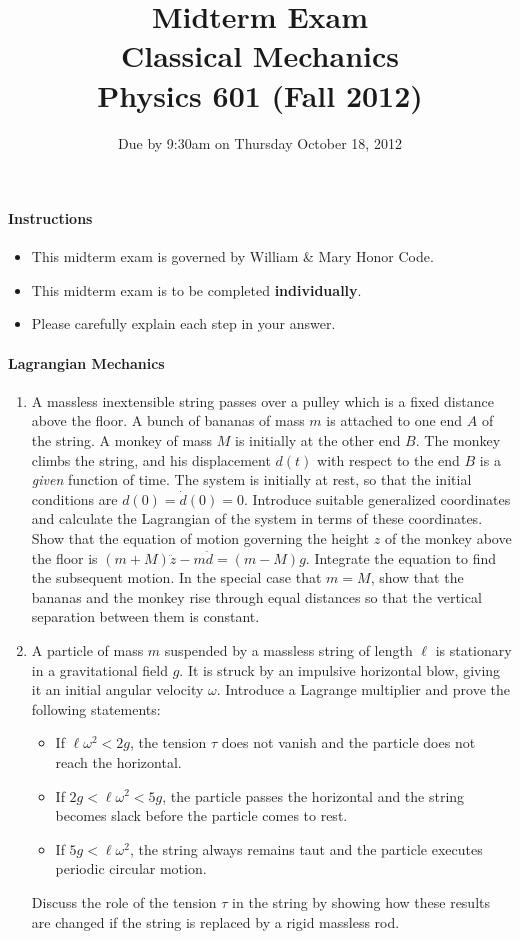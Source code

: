 \documentclass[letterpaper,11pt]{article}
\title{Midterm Exam \\ Classical Mechanics \\ Physics 601 (Fall 2012)}
\date{Due by 9:30am on Thursday October 18, 2012}
\begin{document}
\maketitle

\paragraph*{Instructions}
\begin{itemize}
 \item This midterm exam is governed by William \& Mary Honor Code.
 \item This midterm exam is to be completed \textbf{individually}.
 \item Please carefully explain each step in your answer.
\end{itemize}

\paragraph*{Lagrangian Mechanics}
\begin{enumerate}
 \item A massless inextensible string passes over a pulley which is a fixed distance above the floor.  A bunch of bananas of mass $m$ is attached to one end $A$ of the string.  A monkey of mass $M$ is initially at the other end $B$. The monkey climbs the string, and his displacement $d(t)$ with respect to the end $B$ is a \emph{given} function of time.  The system is initially at rest, so that the initial conditions are $d(0) = \dot{d}(0) = 0$.  Introduce suitable generalized coordinates and calculate the Lagrangian of the system in terms of these coordinates.  Show that the equation of motion governing the height $z$ of the monkey above the floor is $(m+M)\ddot{z} - m\ddot{d} = (m-M)g$.  Integrate the equation to find the subsequent motion.  In the special case that $m = M$, show that the bananas and the monkey rise through equal distances so that the vertical separation between them is constant.
 \item A particle of mass $m$ suspended by a massless string of length $\ell$ is stationary in a gravitational field $g$.  It is struck by an impulsive horizontal blow, giving it an initial angular velocity $\omega$.  Introduce a Lagrange multiplier and prove the following statements:
 \begin{itemize}
  \item If $\ell\omega^2 < 2g$, the tension $\tau$ does not vanish and the particle does not reach the horizontal.
  \item If $2g < \ell\omega^2 < 5g$, the particle passes the horizontal and the string becomes slack before the particle comes to rest.
  \item If $5g < \ell\omega^2$, the string always remains taut and the particle executes periodic circular motion.
 \end{itemize}
 Discuss the role of the tension $\tau$ in the string by showing how these results are changed if the string is replaced by a rigid massless rod.
\end{enumerate}
\end{document}

